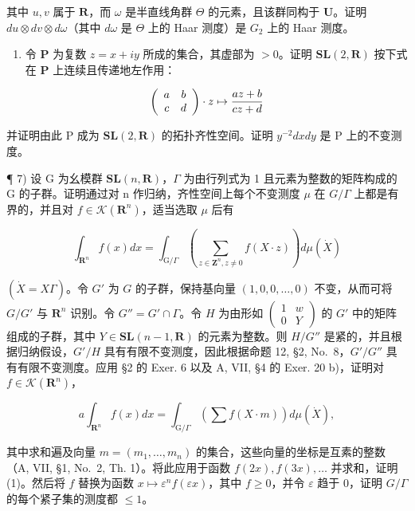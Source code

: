 其中 \(u, v\) 属于 \(\mathbf{R}\)，而 \(\omega\) 是半直线角群 \(\Theta\) 的元素，且该群同构于 \(\mathbf{U}\)。证明 \(du \otimes dv \otimes d\omega\)（其中 \(d\omega\) 是 \(\Theta\) 上的 Haar 测度）是 \(G_2\) 上的 Haar 测度。

\begin{enumerate}
\def\labelenumi{\arabic{enumi})}
\setcounter{enumi}{5}
\tightlist
\item
  令 \(\mathbf{P}\) 为复数 \(z = x + iy\) 所成的集合，其虚部为 \(>0\)。证明 \(\mathbf{SL}(2,\mathbf{R})\) 按下式在 \(\mathbf{P}\) 上连续且传递地左作用：
\end{enumerate}

\[
\left( \begin{array}{c c} a & b \\ c & d \end{array} \right) \cdot z \mapsto \frac {a z + b}{c z + d}
\]

并证明由此 P 成为 \(\mathbf{SL}(2,\mathbf{R})\) 的拓扑齐性空间。证明 \(y^{-2}dx dy\) 是 P 上的不变测度。

¶ 7) 设 G 为幺模群 \(\mathbf{SL}(n,\mathbf{R})\)，\(\Gamma\) 为由行列式为 1 且元素为整数的矩阵构成的 G 的子群。证明通过对 n 作归纳，齐性空间上每个不变测度 \(\mu\) 在 \(G/\Gamma\) 上都是有界的，并且对 \(f \in \mathcal{K}(\mathbf{R}^{n})\)，适当选取 \(\mu\) 后有

\[
\int_ {\mathbf {R} ^ {n}} f (x) d x = \int_ {\mathrm{G} / \Gamma} \left(\sum_ {z \in \mathbf {Z} ^ {n}, z \neq 0} f (X \cdot z)\right) d \mu (\dot {X})\tag{1}
\]

\((\dot{X} = X\Gamma)\)。令 \(G'\) 为 \(G\) 的子群，保持基向量 \((1,0,0,\ldots,0)\) 不变，从而可将 \(G/G'\) 与 \(\mathbf{R}^n\) 识别。令 \(G'' = G' \cap \Gamma\)。令 \(H\) 为由形如 \(\begin{pmatrix} 1 & w \\ 0 & Y \end{pmatrix}\) 的 \(G'\) 中的矩阵组成的子群，其中 \(Y \in \mathbf{SL}(n-1, \mathbf{R})\) 的元素为整数。则 \(H/G''\) 是紧的，并且根据归纳假设，\(G'/H\) 具有有限不变测度，因此根据命题 12, §2, No.~8，\(G'/G''\) 具有有限不变测度。应用 §2 的 Exer. 6 以及 A, VII, §4 的 Exer. 20 b)，证明对 \(f \in \mathcal{K}(\mathbf{R}^n)\)，

\[
a \int_ {\mathbf {R} ^ {n}} f (x) d x = \int_ {\mathrm{G} / \Gamma} \left(\sum f (X \cdot m)\right) d \mu (\dot {X}),
\]

其中求和遍及向量 \(m = (m_1, \ldots, m_n)\) 的集合，这些向量的坐标是互素的整数（A, VII, §1, No.~2, Th. 1）。将此应用于函数 \(f(2x), f(3x), \ldots\) 并求和，证明 (1)。然后将 \(f\) 替换为函数 \(x \mapsto \varepsilon^n f(\varepsilon x)\)，其中 \(f \geqslant 0\)，并令 \(\varepsilon\) 趋于 0，证明 \(G/\Gamma\) 的每个紧子集的测度都 \(\leqslant 1\)。

